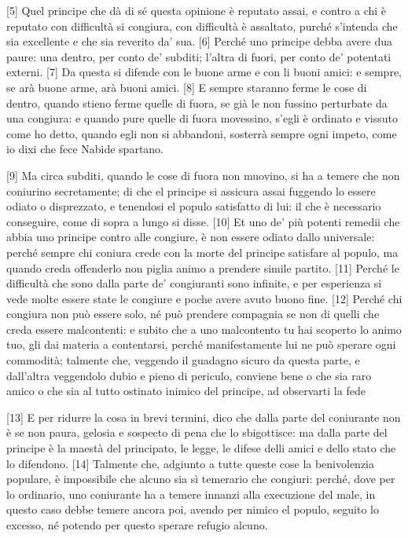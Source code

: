 {[}5{]} Quel principe che dà di sé questa opinione è reputato assai, e
contro a chi è reputato con difficultà si congiura, con difficultà è
assaltato, purché s'intenda che sia excellente e che sia reverito da'
sua. {[}6{]} Perché uno principe debba avere dua paure: una dentro, per
conto de' subditi; l'altra di fuori, per conto de' potentati externi.
{[}7{]} Da questa si difende con le buone arme e con li buoni amici: e
sempre, se arà buone arme, arà buoni amici. {[}8{]} E sempre staranno
ferme le cose di dentro, quando stieno ferme quelle di fuora, se già le
non fussino perturbate da una congiura: e quando pure quelle di fuora
movessino, s'egli è ordinato e vissuto come ho detto, quando egli non si
abbandoni, sosterrà sempre ogni impeto, come io dixi che fece Nabide
spartano.

{[}9{]} Ma circa subditi, quando le cose di fuora non muovino, si ha a
temere che non coniurino secretamente; di che el principe si assicura
assai fuggendo lo essere odiato o disprezzato, e tenendosi el populo
satisfatto di lui: il che è necessario conseguire, come di sopra a lungo
si disse. {[}10{]} Et uno de' più potenti remedii che abbia uno principe
contro alle congiure, è non essere odiato dallo universale: perché
sempre chi coniura crede con la morte del principe satisfare al populo,
ma quando creda offenderlo non piglia animo a prendere simile partito.
{[}11{]} Perché le difficultà che sono dalla parte de' congiuranti sono
infinite, e per esperienza si vede molte essere state le congiure e
poche avere avuto buono fine. {[}12{]} Perché chi congiura non può
essere solo, né può prendere compagnia se non di quelli che creda essere
malcontenti: e subito che a uno malcontento tu hai scoperto lo animo
tuo, gli dai materia a contentarsi, perché manifestamente lui ne può
sperare ogni commodità; talmente che, veggendo il guadagno sicuro da
questa parte, e dall'altra veggendolo dubio e pieno di periculo,
conviene bene o che sia raro amico o che sia al tutto ostinato inimico
del principe, ad observarti la fede

{[}13{]} E per ridurre la cosa in brevi termini, dico che dalla parte
del coniurante non è se non paura, gelosia e sospecto di pena che lo
sbigottisce: ma dalla parte del principe è la maestà del principato, le
legge, le difese delli amici e dello stato che lo difendono. {[}14{]}
Talmente che, adgiunto a tutte queste cose la benivolenzia populare, è
impossibile che alcuno sia sì temerario che congiuri: perché, dove per
lo ordinario, uno coniurante ha a temere innanzi alla execuzione del
male, in questo caso debbe temere ancora poi, avendo per nimico el
populo, seguito lo excesso, né potendo per questo sperare refugio
alcuno.

